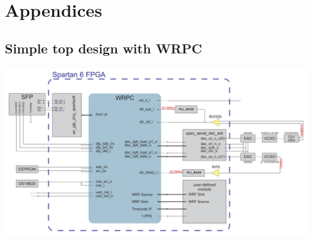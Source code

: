\appendix
\section{Appendices}

\subsection{Simple top design with WRPC}
\label{app:top_design}

\begin{center}
\includegraphics[width=.9\textheight, angle=90]{fig/basic_top.pdf}
\end{center}

